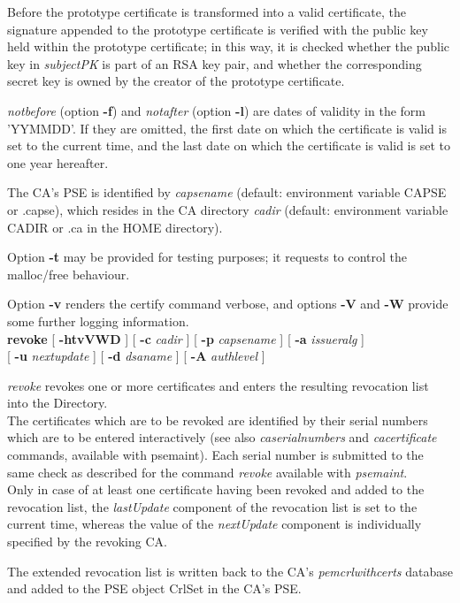 Before the prototype certificate is transformed into a valid certificate, the signature appended to the prototype certificate is verified with the public key held within the prototype certificate; in this way, it is 
checked whether the public key in {\em subjectPK} is part of an RSA key pair, and whether the corresponding
secret key is owned by the creator of the prototype certificate.

{\em notbefore} (option {\bf -f}) and {\em notafter} (option {\bf -l}) are dates of validity in the 
form 'YYMMDD'. If they are omitted, the first date on which the certificate is valid is set to the current time, 
and the last date on which the certificate is valid is set to one year hereafter.
 
The CA's PSE is identified by {\em capsename} (default: environment variable CAPSE or .capse), which resides in the CA directory {\em cadir}
(default: environment variable CADIR or .ca in the HOME directory).
 
Option {\bf -t} may be provided for testing purposes; it requests to control the malloc/free behaviour.

Option {\bf -v} renders the certify command verbose, and options {\bf -V} and {\bf -W} provide 
some further logging information.
\\ [1em]
{\bf revoke} [ {\bf -htvVWD} ] [ {\bf -c} {\em cadir} ] [ {\bf -p} {\em capsename} ] [ {\bf -a} {\em issueralg} ] \\
\hspace*{2cm} [ {\bf -u} {\em nextupdate} ] [ {\bf -d} {\em dsaname} ] [ {\bf -A} {\em authlevel} ]
 
{\em revoke} revokes one or more certificates and enters the resulting revocation list into the 
Directory. \\
 
The certificates which are to be revoked are identified by their serial numbers which are to be
entered interactively (see also {\em caserialnumbers} and {\em cacertificate} commands, available
with psemaint). 
Each serial number is submitted to the same check as described for the command {\em revoke}
available with {\em psemaint}. \\
Only in case of at least one certificate having been revoked and added to the revocation list, the 
{\em lastUpdate} component of the revocation list is set to the current time, whereas the value 
of the {\em nextUpdate} component is individually specified by the revoking CA. 

The extended revocation list is written back to the CA's {\em pemcrlwithcerts} database and
added to the PSE object CrlSet in the CA's PSE.

